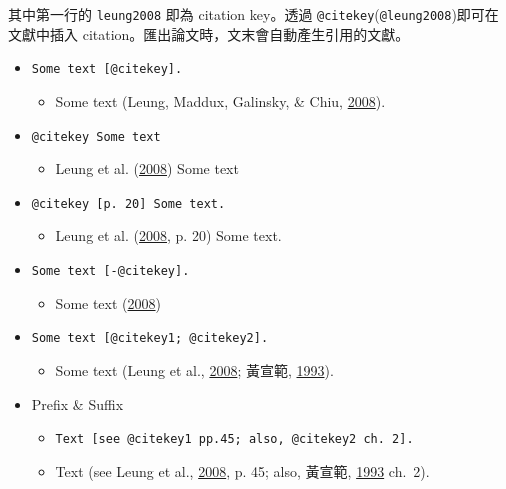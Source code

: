 \documentclass[oneside]{book}
\providecommand{\tightlist}{%
  \setlength{\itemsep}{0pt}\setlength{\parskip}{0pt}}
\begin{document}
其中第一行的 \texttt{leung2008} 即為 citation key。透過 \texttt{@citekey}(\texttt{@leung2008})即可在文獻中插入 citation。匯出論文時，文末會自動產生引用的文獻。

\begin{itemize}
\tightlist
\item
  \texttt{Some\ text\ {[}@citekey{]}.}

  \begin{itemize}
  \tightlist
  \item
    Some text (Leung, Maddux, Galinsky, \& Chiu, \protect\hyperlink{ref-leung2008}{2008}).
  \end{itemize}
\item
  \texttt{@citekey\ Some\ text}

  \begin{itemize}
  \tightlist
  \item
    Leung et al. (\protect\hyperlink{ref-leung2008}{2008}) Some text
  \end{itemize}
\item
  \texttt{@citekey\ {[}p.\ 20{]}\ Some\ text.}

  \begin{itemize}
  \tightlist
  \item
    Leung et al. (\protect\hyperlink{ref-leung2008}{2008}, p. 20) Some text.
  \end{itemize}
\item
  \texttt{Some\ text\ {[}-@citekey{]}.}

  \begin{itemize}
  \tightlist
  \item
    Some text (\protect\hyperlink{ref-leung2008}{2008})
  \end{itemize}
\item
  \texttt{Some\ text\ {[}@citekey1;\ @citekey2{]}.}

  \begin{itemize}
  \tightlist
  \item
    Some text (Leung et al., \protect\hyperlink{ref-leung2008}{2008}; 黃宣範, \protect\hyperlink{ref-huangxuanfan1993}{1993}).
  \end{itemize}
\item
  Prefix \& Suffix

  \begin{itemize}
  \tightlist
  \item
    \texttt{Text\ {[}see\ @citekey1\ pp.45;\ also,\ @citekey2\ ch.\ 2{]}.}
  \item
    Text (see Leung et al., \protect\hyperlink{ref-leung2008}{2008}, p. 45; also, 黃宣範, \protect\hyperlink{ref-huangxuanfan1993}{1993} ch.~2).
  \end{itemize}
\end{itemize}
\end{document}
